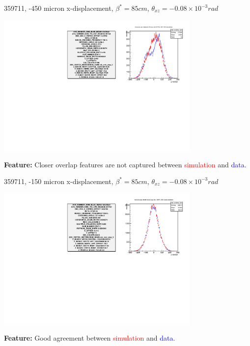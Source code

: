 \begin{frame}{359711, -450 micron x-displacement, $\beta^{*} = 85 cm$, $\theta_{xz} = -0.08\times10^{-3}rad$}
\begin{center}
\includegraphics[width=10cm,scale=0.8]{../HourglassResults/figs/359711_step03_config_compare.pdf}
\end{center}
\textbf{Feature:} Closer overlap features are not captured between \textcolor{red}{simulation} and \textcolor{blue}{data}.
\end{frame}

\begin{frame}{359711, -150 micron x-displacement, $\beta^{*} = 85 cm$, $\theta_{xz} = -0.08\times10^{-3}rad$}
\begin{center}
\includegraphics[width=10cm,scale=0.8]{../HourglassResults/figs/359711_step05_config_compare.pdf}
\end{center}
\textbf{Feature:} Good agreement between \textcolor{red}{simulation} and \textcolor{blue}{data}.
\end{frame}

